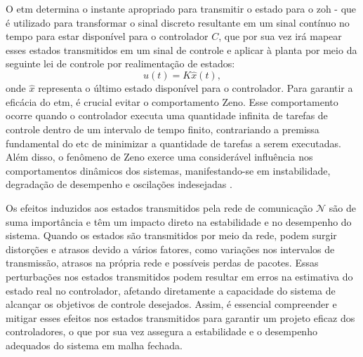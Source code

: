 O \acrshort{etm} determina o instante apropriado para transmitir o estado para o \acrfull{zoh} - que é utilizado para transformar o sinal discreto resultante em um sinal contínuo no tempo para estar disponível para o controlador $C$, que por sua vez irá mapear esses estados transmitidos em um sinal de controle e aplicar à planta por meio da seguinte lei de controle por realimentação de estados: \begin{equation}u(t) = K \hat{x}(t),\end{equation} onde $\hat{x}$ representa o último estado disponível para o controlador. Para garantir a eficácia do \acrshort{etm}, é crucial evitar o comportamento Zeno. Esse comportamento ocorre quando o controlador executa uma quantidade infinita de tarefas de controle dentro de um intervalo de tempo finito, contrariando a premissa fundamental do \acrshort{etc} de minimizar a quantidade de tarefas a serem executadas. Além disso, o fenômeno de Zeno exerce uma considerável influência nos comportamentos dinâmicos dos sistemas, manifestando-se em instabilidade, degradação de desempenho e oscilações indesejadas \citep{Yang2024}.

Os efeitos induzidos aos estados transmitidos pela rede de comunicação $\mathcal{N}$ são de suma importância e têm um impacto direto na estabilidade e no desempenho do sistema. Quando os estados são transmitidos por meio da rede, podem surgir distorções e atrasos devido a vários fatores, como variações nos intervalos de transmissão, atrasos na própria rede e possíveis perdas de pacotes. Essas perturbações nos estados transmitidos podem resultar em erros na estimativa do estado real no controlador, afetando diretamente a capacidade do sistema de alcançar os objetivos de controle desejados. Assim, é essencial compreender e mitigar esses efeitos nos estados transmitidos para garantir um projeto eficaz dos controladores, o que por sua vez assegura a estabilidade e o desempenho adequados do sistema em malha fechada.


